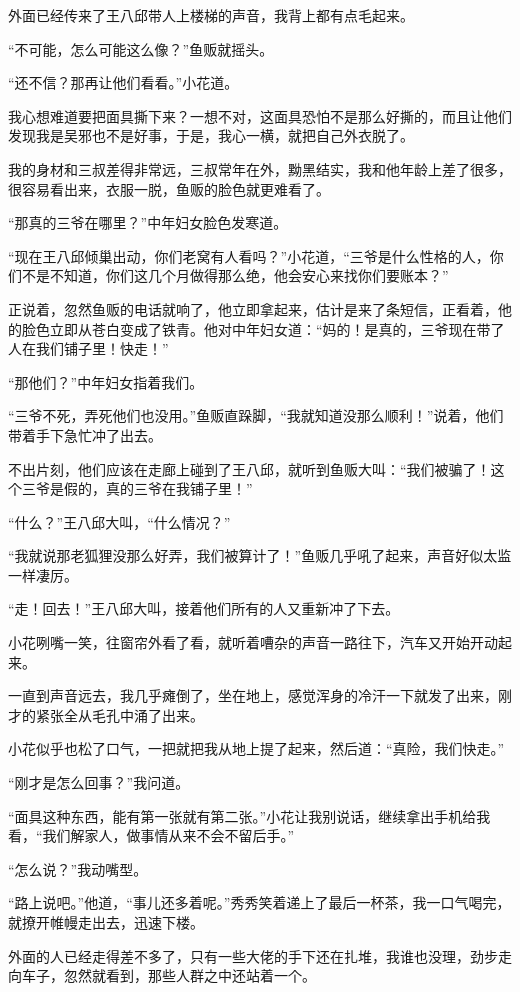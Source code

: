 外面已经传来了王八邱带人上楼梯的声音，我背上都有点毛起来。

“不可能，怎么可能这么像？”鱼贩就摇头。

“还不信？那再让他们看看。”小花道。

我心想难道要把面具撕下来？一想不对，这面具恐怕不是那么好撕的，而且让他们发现我是吴邪也不是好事，于是，我心一横，就把自己外衣脱了。

我的身材和三叔差得非常远，三叔常年在外，黝黑结实，我和他年龄上差了很多，很容易看出来，衣服一脱，鱼贩的脸色就更难看了。

“那真的三爷在哪里？”中年妇女脸色发寒道。

“现在王八邱倾巢出动，你们老窝有人看吗？”小花道，“三爷是什么性格的人，你们不是不知道，你们这几个月做得那么绝，他会安心来找你们要账本？”

正说着，忽然鱼贩的电话就响了，他立即拿起来，估计是来了条短信，正看着，他的脸色立即从苍白变成了铁青。他对中年妇女道：“妈的！是真的，三爷现在带了人在我们铺子里！快走！”

“那他们？”中年妇女指着我们。

“三爷不死，弄死他们也没用。”鱼贩直跺脚，“我就知道没那么顺利！”说着，他们带着手下急忙冲了出去。

不出片刻，他们应该在走廊上碰到了王八邱，就听到鱼贩大叫：“我们被骗了！这个三爷是假的，真的三爷在我铺子里！”

“什么？”王八邱大叫，“什么情况？”

“我就说那老狐狸没那么好弄，我们被算计了！”鱼贩几乎吼了起来，声音好似太监一样凄厉。

“走！回去！”王八邱大叫，接着他们所有的人又重新冲了下去。

小花咧嘴一笑，往窗帘外看了看，就听着嘈杂的声音一路往下，汽车又开始开动起来。

一直到声音远去，我几乎瘫倒了，坐在地上，感觉浑身的冷汗一下就发了出来，刚才的紧张全从毛孔中涌了出来。

小花似乎也松了口气，一把就把我从地上提了起来，然后道：“真险，我们快走。”

“刚才是怎么回事？”我问道。

“面具这种东西，能有第一张就有第二张。”小花让我别说话，继续拿出手机给我看，“我们解家人，做事情从来不会不留后手。”

“怎么说？”我动嘴型。

“路上说吧。”他道，“事儿还多着呢。”秀秀笑着递上了最后一杯茶，我一口气喝完，就撩开帷幔走出去，迅速下楼。

外面的人已经走得差不多了，只有一些大佬的手下还在扎堆，我谁也没理，劲步走向车子，忽然就看到，那些人群之中还站着一个。

